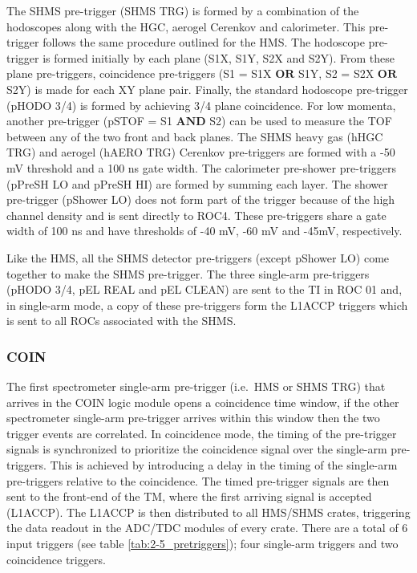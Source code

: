 \documentclass[
]{report}
\begin{document}
The SHMS pre-trigger (SHMS TRG) is formed by a combination of the
hodoscopes along with the HGC, aerogel Cerenkov and calorimeter. This
pre-trigger follows the same procedure outlined for the HMS. The
hodoscope pre-trigger is formed initially by each plane (S1X, S1Y, S2X
and S2Y). From these plane pre-triggers, coincidence pre-triggers (S1 =
S1X \(\textbf{OR}\) S1Y, S2 = S2X \(\textbf{OR}\) S2Y) is made for each
XY plane pair. Finally, the standard hodoscope pre-trigger (pHODO 3/4)
is formed by achieving 3/4 plane coincidence. For low momenta, another
pre-trigger (pSTOF = S1 \(\textbf{AND}\) S2) can be used to measure the
TOF between any of the two front and back planes. The SHMS heavy gas
(hHGC TRG) and aerogel (hAERO TRG) Cerenkov pre-triggers are formed with
a -50 mV threshold and a 100 ns gate width. The calorimeter pre-shower
pre-triggers (pPreSH LO and pPreSH HI) are formed by summing each layer.
The shower pre-trigger (pShower LO) does not form part of the trigger
because of the high channel density and is sent directly to ROC4. These
pre-triggers share a gate width of 100 ns and have thresholds of -40 mV,
-60 mV and -45mV, respectively.

Like the HMS, all the SHMS detector pre-triggers (except pShower LO)
come together to make the SHMS pre-trigger. The three single-arm
pre-triggers (pHODO 3/4, pEL REAL and pEL CLEAN) are sent to the TI in
ROC 01 and, in single-arm mode, a copy of these pre-triggers form the
L1ACCP triggers which is sent to all ROCs associated with the SHMS.

\hypertarget{coin}{%
\subsubsection{COIN}\label{coin}}



The first spectrometer single-arm pre-trigger (i.e.~HMS or SHMS TRG)
that arrives in the COIN logic module opens a coincidence time window,
if the other spectrometer single-arm pre-trigger arrives within this
window then the two trigger events are correlated. In coincidence mode,
the timing of the pre-trigger signals is synchronized to prioritize the
coincidence signal over the single-arm pre-triggers. This is achieved by
introducing a delay in the timing of the single-arm pre-triggers
relative to the coincidence. The timed pre-trigger signals are then sent
to the front-end of the TM, where the first arriving signal is accepted
(L1ACCP). The L1ACCP is then distributed to all HMS/SHMS crates,
triggering the data readout in the ADC/TDC modules of every crate. There
are a total of 6 input triggers (see table \ref{tab:2-5_pretriggers});
four single-arm triggers and two coincidence triggers.
\end{document}
